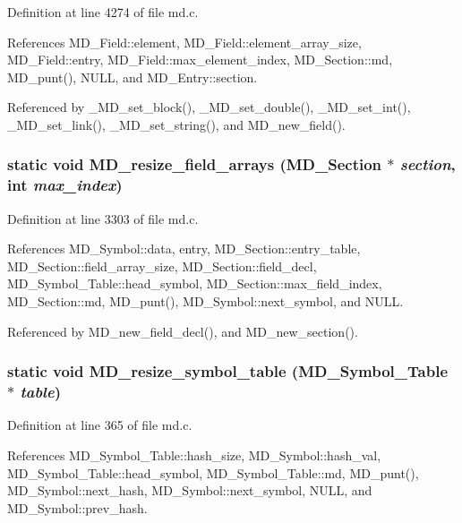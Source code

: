 Definition at line 4274 of file md.c.

References MD\_\-Field::element, MD\_\-Field::element\_\-array\_\-size, MD\_\-Field::entry, MD\_\-Field::max\_\-element\_\-index, MD\_\-Section::md, MD\_\-punt(), NULL, and MD\_\-Entry::section.

Referenced by \_\-MD\_\-set\_\-block(), \_\-MD\_\-set\_\-double(), \_\-MD\_\-set\_\-int(), \_\-MD\_\-set\_\-link(), \_\-MD\_\-set\_\-string(), and MD\_\-new\_\-field().
\subsubsection{\setlength{\rightskip}{0pt plus 5cm}static void MD\_\-resize\_\-field\_\-arrays (\bf{MD\_\-Section} $\ast$ {\em section}, int {\em max\_\-index})\hspace{0.3cm}{\tt  [static]}}\label{md_8c_42906729fd5b4722906894dea02c67ec}




Definition at line 3303 of file md.c.

References MD\_\-Symbol::data, entry, MD\_\-Section::entry\_\-table, MD\_\-Section::field\_\-array\_\-size, MD\_\-Section::field\_\-decl, MD\_\-Symbol\_\-Table::head\_\-symbol, MD\_\-Section::max\_\-field\_\-index, MD\_\-Section::md, MD\_\-punt(), MD\_\-Symbol::next\_\-symbol, and NULL.

Referenced by MD\_\-new\_\-field\_\-decl(), and MD\_\-new\_\-section().
\subsubsection{\setlength{\rightskip}{0pt plus 5cm}static void MD\_\-resize\_\-symbol\_\-table (\bf{MD\_\-Symbol\_\-Table} $\ast$ {\em table})\hspace{0.3cm}{\tt  [static]}}\label{md_8c_32c025bc1def2dc2be1e245ab5995649}




Definition at line 365 of file md.c.

References MD\_\-Symbol\_\-Table::hash\_\-size, MD\_\-Symbol::hash\_\-val, MD\_\-Symbol\_\-Table::head\_\-symbol, MD\_\-Symbol\_\-Table::md, MD\_\-punt(), MD\_\-Symbol::next\_\-hash, MD\_\-Symbol::next\_\-symbol, NULL, and MD\_\-Symbol::prev\_\-hash.


